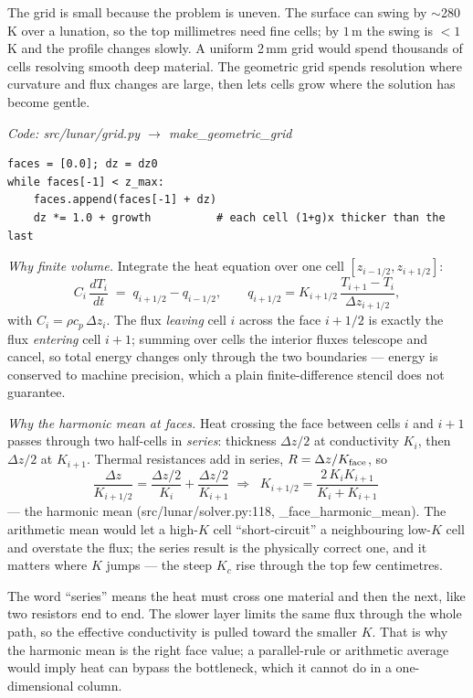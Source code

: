 \documentclass[11pt]{report}
\newcommand{\code}[1]{{\ttfamily\small #1}}
\begin{document}
\begin{plain}
The grid is small because the problem is uneven. The surface can swing by
$\sim$280\,K over a lunation, so the top millimetres need fine cells; by
$1$\,m the swing is $<1$\,K and the profile changes slowly. A uniform 2\,mm grid
would spend thousands of cells resolving smooth deep material. The geometric
grid spends resolution where curvature and flux changes are large, then lets
cells grow where the solution has become gentle.
\end{plain}

{\small\color{dim}\textit{Code: \code{src/lunar/grid.py} $\to$ \code{make\_geometric\_grid}}}
\begin{lstlisting}[style=py]
faces = [0.0]; dz = dz0
while faces[-1] < z_max:
    faces.append(faces[-1] + dz)
    dz *= 1.0 + growth          # each cell (1+g)x thicker than the last
\end{lstlisting}

\emph{Why finite volume.} Integrate the heat equation over one cell
$[z_{i-1/2},z_{i+1/2}]$:
\[
C_i\,\frac{dT_i}{dt} \;=\; q_{i+1/2}-q_{i-1/2},\qquad
q_{i+1/2}=K_{i+1/2}\,\frac{T_{i+1}-T_i}{\Delta z_{i+1/2}},
\]
with $C_i=\rho c_p\,\Delta z_i$. The flux \emph{leaving} cell $i$ across the face
$i{+}1/2$ is exactly the flux \emph{entering} cell $i{+}1$; summing over cells the
interior fluxes telescope and cancel, so total energy changes only through the
two boundaries --- energy is conserved to machine precision, which a plain
finite-difference stencil does not guarantee.

\emph{Why the harmonic mean at faces.} Heat crossing the face between cells $i$
and $i{+}1$ passes through two half-cells in \emph{series}: thickness
$\Delta z/2$ at conductivity $K_i$, then $\Delta z/2$ at $K_{i+1}$. Thermal
resistances add in series, $R=\Delta z/K_{\rm face}$, so
\[
\frac{\Delta z}{K_{i+1/2}} = \frac{\Delta z/2}{K_i}+\frac{\Delta z/2}{K_{i+1}}
\;\Rightarrow\;
\boxed{\;K_{i+1/2}=\frac{2\,K_i K_{i+1}}{K_i+K_{i+1}}\;}
\]
--- the harmonic mean (\code{src/lunar/solver.py:118},
\code{\_face\_harmonic\_mean}). The arithmetic mean would let a high-$K$ cell
``short-circuit'' a neighbouring low-$K$ cell and overstate the flux; the series
result is the physically correct one, and it matters where $K$ jumps --- the
steep $K_c$ rise through the top few centimetres.

\begin{plain}
The word ``series'' means the heat must cross one material and then the next,
like two resistors end to end. The slower layer limits the same flux through the
whole path, so the effective conductivity is pulled toward the smaller $K$.
That is why the harmonic mean is the right face value; a parallel-rule or
arithmetic average would imply heat can bypass the bottleneck, which it cannot
do in a one-dimensional column.
\end{plain}
\end{document}

